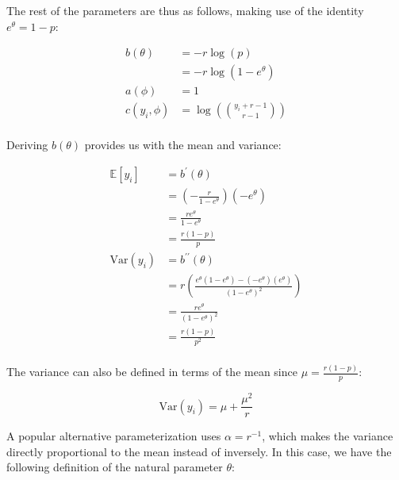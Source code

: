 \documentclass{report}
\begin{document}
The rest of the parameters are thus as follows, making use of the identity $e^\theta = 1 - p$:

\begin{equation}\label{eq:exp-glm-nb-dist-params}
    \begin{aligned}
        b(\theta)
          &= -r\log(p) \\
          &= -r\log(1 - e^\theta) \\
        a(\phi) &= 1 \\
        c(y_i, \phi) &= \log\left(\binom{y_i+r-1}{r-1}\right) \\
    \end{aligned}
\end{equation}

Deriving $b(\theta)$ provides us with the mean and variance:

\begin{equation}\label{eq:ex-glm-nb-dist-mean-var}
    \begin{aligned}
        \mathbb{E}[y_i]
          &= b^\prime(\theta) \\
          &= \left(-\frac{r}{1-e^\theta}\right)\left(-e^\theta\right) \\
          &= \frac{re^\theta}{1-e^\theta} \\
          &= \frac{r(1-p)}{p} \\
        \text{Var}(y_i)
          &= b^{\prime\prime}(\theta) \\
          &= r\left(\frac{e^\theta\left(1-e^\theta\right) - \left(-e^\theta\right)\left(e^\theta\right)}{\left(1-e^\theta\right)^2}\right) \\
          &= \frac{re^\theta}{\left(1-e^\theta\right)^2} \\
          &= \frac{r(1-p)}{p^2} \\
    \end{aligned}
\end{equation}

The variance can also be defined in terms of the mean since $\mu = \frac{r(1-p)}{p}$:

\begin{equation}\label{eq:ex-glm-nb-dist-variance-by-mean}
    \text{Var}(y_i) = \mu + \frac{\mu^2}{r}
\end{equation}

A popular alternative parameterization uses $\alpha = r^{-1}$, which makes the variance directly proportional to the mean instead of inversely. In this case, we have the following definition of the natural parameter $\theta$:
\end{document}
